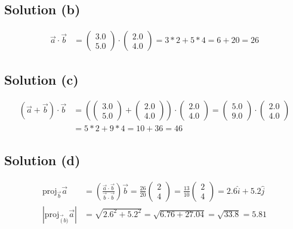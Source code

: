 \documentclass[12pt]{article}
\newcommand{\proj}{\text{proj}}
\begin{document}
\subsection{Solution (b)}
\begin{align*}
    \vec{a} \cdot \vec{b}  &=  \begin{pmatrix} 3.0 \\ 5.0 \end{pmatrix} \cdot \begin{pmatrix} 2.0 \\ 4.0 \end{pmatrix}
        =   3*2 + 5*4
        =   6 + 20
        =   \boxed {26}
\end{align*}

\subsection{Solution (c)}
\begin{align*}
    \left(\vec{a} + \vec{b}\right) \cdot \vec{b}    &=  \left(\begin{pmatrix} 3.0 \\ 5.0 \end{pmatrix} + \begin{pmatrix} 2.0 \\ 4.0 \end{pmatrix}\right) \cdot \begin{pmatrix} 2.0 \\ 4.0 \end{pmatrix}
        =   \begin{pmatrix} 5.0 \\ 9.0 \end{pmatrix} \cdot \begin{pmatrix} 2.0 \\ 4.0 \end{pmatrix}\\
        &=  5 * 2 + 9 * 4
        =   10 + 36
        =   \boxed{46}
\end{align*}

\subsection{Solution (d)}
\begin{align*}
    \proj_{\vec{b}} \vec{a} &=  \left(\frac{\vec{a} \cdot \vec{b}}{\vec{b} \cdot \vec{b}}\right)\vec{b}
        =   \frac{26}{20} \begin{pmatrix} 2\\4 \end{pmatrix}
        =   \frac{13}{10} \begin{pmatrix} 2\\4 \end{pmatrix}
        =   2.6\hat{i} + 5.2\hat{j}\\
    \left|\proj_{\vec(b)} \vec{a}\right| &= \sqrt{2.6^2 + 5.2^2}
        =   \sqrt{6.76 + 27.04}
        =   \sqrt{33.8}
        =   \boxed{5.81}
\end{align*}
\end{document}
